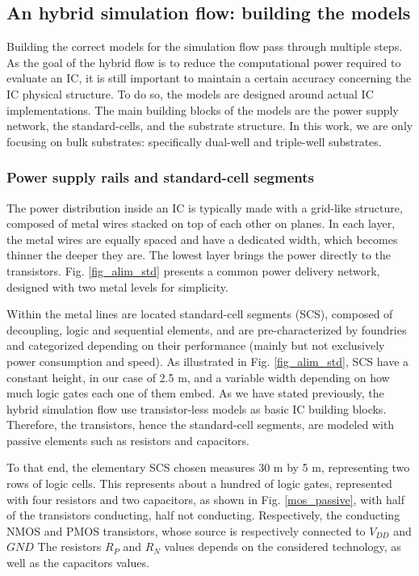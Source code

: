 \subsection{An hybrid simulation flow: building the models}
	Building the correct models for the simulation flow pass through multiple steps.
	As the goal of the hybrid flow is to reduce the computational power required to evaluate an IC, it is still important to maintain a certain accuracy concerning the IC physical structure.
	To do so, the models are designed around actual IC implementations.
	The main building blocks of the models are the power supply network, the standard-cells, and the substrate structure.
	In this work, we are only focusing on bulk substrates: specifically dual-well and triple-well substrates.

	\subsubsection{Power supply rails and standard-cell segments}
	
	The power distribution inside an IC is typically made with a grid-like structure, composed of metal wires stacked on top of each other on planes.
	In each layer, the metal wires are equally spaced and have a dedicated width, which becomes thinner the deeper they are.
	The lowest layer brings the power directly to the transistors.
	Fig. \ref{fig_alim_std} presents a common power delivery network, designed with two metal levels for simplicity.

	Within the metal lines are located standard-cell segments (SCS), composed of decoupling, logic and sequential elements, and are pre-characterized by foundries and categorized depending on their performance (mainly but not exclusively power consumption and speed).
	As illustrated in Fig. \ref{fig_alim_std}, SCS have a constant height, in our case of 2.5 \textmu m, and a variable width depending on how much logic gates each one of them embed.
	As we have stated previously, the hybrid simulation flow use transistor-less models as basic IC building blocks.
	Therefore, the transistors, hence the standard-cell segments, are modeled with passive elements such as resistors and capacitors.

	
	To that end, the elementary SCS chosen measures 30 \textmu m by 5 \textmu m, representing two rows of logic cells.
	This represents about a hundred of logic gates, represented with four resistors and two capacitors, as shown in Fig. \ref{mos_passive}, with half of the transistors conducting, half not conducting.
	Respectively, the conducting NMOS and PMOS transistors, whose source is respectively connected to $V_{DD}$ and $GND$
	The resistors $R_P$ and $R_N$ values depends on the considered technology, as well as the capacitors values.

